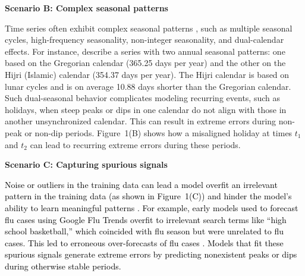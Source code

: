 \documentclass[12pt]{article}
\newcommand{\matt}[1]{\textcolor{black}{#1}}
\newenvironment{scenario}[1]{%
  \par\vspace{1ex}\noindent\textbf{#1}\par\vspace{0.5ex}}{\par}
\begin{document}
\begin{scenario}{Scenario B: Complex seasonal patterns}

Time series often exhibit complex seasonal patterns \citep{zhao2024}, such as multiple seasonal cycles, high-frequency seasonality, non-integer seasonality, and dual-calendar effects. For instance, \cite{delivera2011} describe a series with two annual seasonal patterns: one based on the Gregorian calendar (365.25 days per year) and the other on the Hijri (Islamic) calendar (354.37 days per year). The Hijri calendar is based on lunar cycles and is on average 10.88 days shorter than the Gregorian calendar. Such dual-seasonal behavior complicates modeling recurring events, such as holidays, when steep peaks or dips in one calendar do not align with those in another unsynchronized calendar. This can %
result in extreme errors during non-peak or non-dip periods. %
Figure~1(B) shows %
how a misaligned holiday at times $t_1$ and $t_2$ can lead to recurring extreme errors during these periods.
\end{scenario}

\begin{scenario}{Scenario C: Capturing spurious signals}

\matt{Noise or outliers in the training data can lead a model overfit an irrelevant pattern in the training data (as shown in Figure~1(C)) and hinder the model's ability to learn meaningful patterns \citep{cakmak2024}. For example, early models used to forecast flu cases using Google Flu Trends overfit to irrelevant search terms like ``high school basketball,'' which coincided with flu season but were unrelated to flu cases. This led to erroneous over-forecasts of flu cases \citep{lazer2014}. Models that fit these spurious signals generate extreme errors by predicting nonexistent peaks or dips during otherwise stable periods.}
\end{scenario}

\end{document}
